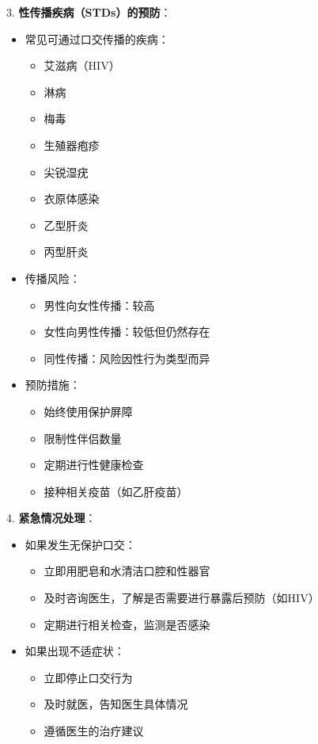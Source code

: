 \documentclass[12pt,UTF8]{ctexbook}
\begin{document}
3. \textbf{性传播疾病（STDs）的预防}：
  \begin{itemize}
  \item 常见可通过口交传播的疾病：
    \begin{itemize}
    \item 艾滋病（HIV）
    \item 淋病
    \item 梅毒
    \item 生殖器疱疹
    \item 尖锐湿疣
    \item 衣原体感染
    \item 乙型肝炎
    \item 丙型肝炎
    \end{itemize}
  \item 传播风险：
    \begin{itemize}
    \item 男性向女性传播：较高
    \item 女性向男性传播：较低但仍然存在
    \item 同性传播：风险因性行为类型而异
    \end{itemize}
  \item 预防措施：
    \begin{itemize}
    \item 始终使用保护屏障
    \item 限制性伴侣数量
    \item 定期进行性健康检查
    \item 接种相关疫苗（如乙肝疫苗）
    \end{itemize}
  \end{itemize}

4. \textbf{紧急情况处理}：
  \begin{itemize}
  \item 如果发生无保护口交：
    \begin{itemize}
    \item 立即用肥皂和水清洁口腔和性器官
    \item 及时咨询医生，了解是否需要进行暴露后预防（如HIV）
    \item 定期进行相关检查，监测是否感染
    \end{itemize}
  \item 如果出现不适症状：
    \begin{itemize}
    \item 立即停止口交行为
    \item 及时就医，告知医生具体情况
    \item 遵循医生的治疗建议
    \end{itemize}
  \end{itemize}
\end{document}
